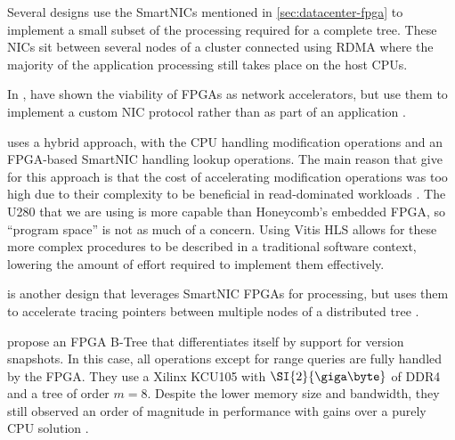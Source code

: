

Several designs \autocite{honeycomb,strom,star} use the SmartNICs mentioned in
\ref{sec:datacenter-fpga} to implement a small subset of the processing required
for a complete tree. These NICs sit between several nodes of a cluster connected
using RDMA where the majority of the application processing still takes place on
the host CPUs.

In , \citeauthor{star} have shown the viability of FPGAs as
network accelerators, but use them to implement a custom NIC protocol rather
than as part of an application \autocite{star}.


 uses a hybrid approach, with the CPU handling modification
operations and an FPGA-based SmartNIC handling lookup operations. The main
reason that \citeauthor{honeycomb} give for this approach is that the cost of
accelerating modification operations was too high due to their complexity to be
beneficial in read-dominated workloads \autocite{honeycomb}. The U280 that we
are using is more capable than Honeycomb's embedded FPGA, so ``program space''
is not as much of a concern. Using Vitis HLS allows for these more complex
procedures to be described in a traditional software context, lowering the
amount of effort required to implement them effectively.

 is another design that leverages SmartNIC FPGAs for
processing, but uses them to accelerate tracing pointers between multiple nodes
of a distributed tree \autocite{strom}.

\citeauthor{ren-fpl-2019} propose an FPGA B-Tree that differentiates itself by
support for version snapshots. In this case, all operations except for range
queries are fully handled by the FPGA. They use a Xilinx KCU105 with
$\SI{2}{\giga\byte}$ of DDR4 and a tree of order $m=8$. Despite the lower memory
size and bandwidth, they still observed an order of magnitude in performance
with gains over a purely CPU solution \autocite{ren-fpl-2019}.
